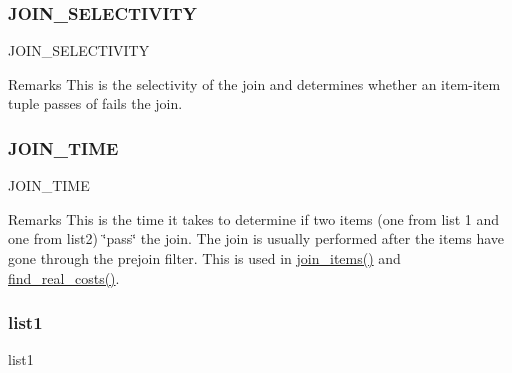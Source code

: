 \subsubsection{\texorpdfstring{J\+O\+I\+N\+\_\+\+S\+E\+L\+E\+C\+T\+I\+V\+I\+TY}{JOIN\_SELECTIVITY}}
{\footnotesize\ttfamily J\+O\+I\+N\+\_\+\+S\+E\+L\+E\+C\+T\+I\+V\+I\+TY}

\begin{DoxyRemark}{Remarks}
This is the selectivity of the join and determines whether an item-\/item tuple passes of fails the join. 
\end{DoxyRemark}
\mbox{\label{classdynamicfilterapp_1_1models_1_1_join_a2c37c419033162e3fc2632987e65647e}} 
\subsubsection{\texorpdfstring{J\+O\+I\+N\+\_\+\+T\+I\+ME}{JOIN\_TIME}}
{\footnotesize\ttfamily J\+O\+I\+N\+\_\+\+T\+I\+ME}

\begin{DoxyRemark}{Remarks}
This is the time it takes to determine if two items (one from list 1 and one from list2) \char`\"{}pass\char`\"{} the join. The join is usually performed after the items have gone through the prejoin filter. This is used in \hyperlink{classdynamicfilterapp_1_1models_1_1_join_af917b6ab7796d7f1e90cb6a45b164120}{join\+\_\+items()} and \hyperlink{classdynamicfilterapp_1_1models_1_1_join_adb5d30a19bc96815ec8f79b9ddefb1cf}{find\+\_\+real\+\_\+costs()}. 
\end{DoxyRemark}
\mbox{\label{classdynamicfilterapp_1_1models_1_1_join_a6a3026f5b982e8d120fcdf1263775a9f}} 
\subsubsection{\texorpdfstring{list1}{list1}}
{\footnotesize\ttfamily list1}


